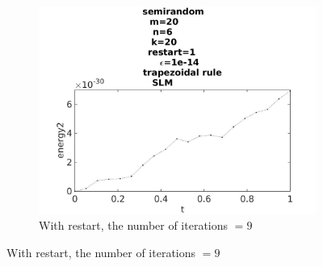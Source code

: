 \begin{figure}[H]
        ~
        \begin{subfigure}[b]{0.3\textwidth}
                \includegraphics[width=\textwidth]{../MATLAB/fig/energytestrestart12.jpg}
                \caption{ With restart, the number of iterations $= 9$ }
                \label{fig:energytestrestart12}
        \end{subfigure}
        

\end{figure}
